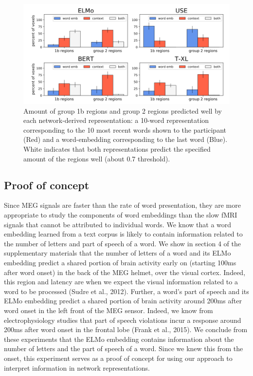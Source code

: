 \documentclass{article}
\begin{document}
\begin{figure}[t]
\centering
\includegraphics[width=1.1\columnwidth]{pycortex.png}
\caption{Amount of group 1b regions and group 2 regions predicted well by each network-derived representation: a 10-word representation corresponding to the 10 most recent words shown to the participant (Red) and a word-embedding corresponding to the last word (Blue). White indicates that both representations predict the specified amount of the regions well (about 0.7 threshold).\label{fig:pycortex}}
\end{figure}

\subsection{Proof of concept}
Since MEG signals are faster than the rate of word presentation, they are more
appropriate to study the components of word embeddings than the slow fMRI signals that cannot be
attributed to individual words. We know that a word embedding learned from a text corpus is likely to
contain information related to the number of letters and part of speech of a word. We show in section
4 of the supplementary materials that the number of letters of a word and its ELMo embedding
predict a shared portion of brain activity early on (starting 100ms after word onset) in the back of the
MEG helmet, over the visual cortex. Indeed, this region and latency are when we expect the visual
information related to a word to be processed (Sudre et al., 2012). Further, a word’s part of speech
and its ELMo embedding predict a shared portion of brain activity around 200ms after word onset in
the left front of the MEG sensor. Indeed, we know from electrophysiology studies that part of speech
violations incur a response around 200ms after word onset in the frontal lobe (Frank et al., 2015). We
conclude from these experiments that the ELMo embedding contains information about the number
of letters and the part of speech of a word. Since we knew this from the onset, this experiment serves
as a proof of concept for using our approach to interpret information in network representations.
\end{document}

